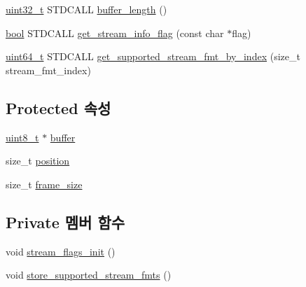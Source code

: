 \begin{DoxyCompactItemize}
\item 
\hyperlink{parse_8c_a6eb1e68cc391dd753bc8ce896dbb8315}{uint32\+\_\+t} S\+T\+D\+C\+A\+LL \hyperlink{classavdecc__lib_1_1stream__output__descriptor__response__imp_a40149b8c489bce1cc06d3411fa6619d2}{buffer\+\_\+length} ()
\item 
\hyperlink{avb__gptp_8h_af6a258d8f3ee5206d682d799316314b1}{bool} S\+T\+D\+C\+A\+LL \hyperlink{classavdecc__lib_1_1stream__output__descriptor__response__imp_a037028f7ae6e9ea768200d370c7dadbd}{get\+\_\+stream\+\_\+info\+\_\+flag} (const char $\ast$flag)
\item 
\hyperlink{parse_8c_aec6fcb673ff035718c238c8c9d544c47}{uint64\+\_\+t} S\+T\+D\+C\+A\+LL \hyperlink{classavdecc__lib_1_1stream__output__descriptor__response__imp_a78bde361afa9769b9edd018346d6e8e0}{get\+\_\+supported\+\_\+stream\+\_\+fmt\+\_\+by\+\_\+index} (size\+\_\+t stream\+\_\+fmt\+\_\+index)
\end{DoxyCompactItemize}
\subsection*{Protected 속성}
\begin{DoxyCompactItemize}
\item 
\hyperlink{stdint_8h_aba7bc1797add20fe3efdf37ced1182c5}{uint8\+\_\+t} $\ast$ \hyperlink{classavdecc__lib_1_1descriptor__response__base__imp_a56ed84df35de10bdb65e72b184309497}{buffer}
\item 
size\+\_\+t \hyperlink{classavdecc__lib_1_1descriptor__response__base__imp_a7a04afe5347934be732ec70a70bd0a28}{position}
\item 
size\+\_\+t \hyperlink{classavdecc__lib_1_1descriptor__response__base__imp_affd041a595cabab98275245b9cb2824d}{frame\+\_\+size}
\end{DoxyCompactItemize}
\subsection*{Private 멤버 함수}
\begin{DoxyCompactItemize}
\item 
void \hyperlink{classavdecc__lib_1_1stream__output__descriptor__response__imp_a61edd2027d6d2e089f949076cc966006}{stream\+\_\+flags\+\_\+init} ()
\item 
void \hyperlink{classavdecc__lib_1_1stream__output__descriptor__response__imp_a66d3a0ab7d0f8bf40bcc903cd9415dcd}{store\+\_\+supported\+\_\+stream\+\_\+fmts} ()
\end{DoxyCompactItemize}
